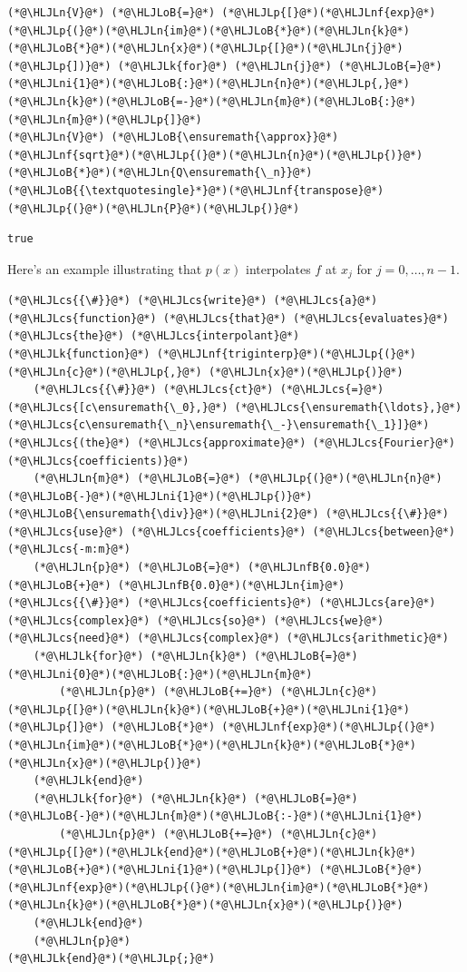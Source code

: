 \documentclass[12pt,landscape]{article}
\newcommand{\HLJLk}[1]{\textcolor[RGB]{148,91,176}{\textbf{#1}}}
\newcommand{\HLJLn}[1]{#1}
\newcommand{\HLJLnf}[1]{\textcolor[RGB]{66,102,213}{#1}}
\newcommand{\HLJLnfB}[1]{\textcolor[RGB]{59,151,46}{#1}}
\newcommand{\HLJLni}[1]{\textcolor[RGB]{59,151,46}{#1}}
\newcommand{\HLJLoB}[1]{\textcolor[RGB]{102,102,102}{\textbf{#1}}}
\newcommand{\HLJLp}[1]{#1}
\newcommand{\HLJLcs}[1]{\textcolor[RGB]{153,153,119}{\textit{#1}}}
\begin{document}
{\begin{lstlisting}
(*@\HLJLn{V}@*) (*@\HLJLoB{=}@*) (*@\HLJLp{[}@*)(*@\HLJLnf{exp}@*)(*@\HLJLp{(}@*)(*@\HLJLn{im}@*)(*@\HLJLoB{*}@*)(*@\HLJLn{k}@*)(*@\HLJLoB{*}@*)(*@\HLJLn{x}@*)(*@\HLJLp{[}@*)(*@\HLJLn{j}@*)(*@\HLJLp{])}@*) (*@\HLJLk{for}@*) (*@\HLJLn{j}@*) (*@\HLJLoB{=}@*) (*@\HLJLni{1}@*)(*@\HLJLoB{:}@*)(*@\HLJLn{n}@*)(*@\HLJLp{,}@*) (*@\HLJLn{k}@*)(*@\HLJLoB{=-}@*)(*@\HLJLn{m}@*)(*@\HLJLoB{:}@*)(*@\HLJLn{m}@*)(*@\HLJLp{]}@*)
(*@\HLJLn{V}@*) (*@\HLJLoB{\ensuremath{\approx}}@*) (*@\HLJLnf{sqrt}@*)(*@\HLJLp{(}@*)(*@\HLJLn{n}@*)(*@\HLJLp{)}@*)(*@\HLJLoB{*}@*)(*@\HLJLn{Q\ensuremath{\_n}}@*)(*@\HLJLoB{{\textquotesingle}*}@*)(*@\HLJLnf{transpose}@*)(*@\HLJLp{(}@*)(*@\HLJLn{P}@*)(*@\HLJLp{)}@*)
\end{lstlisting}

\begin{lstlisting}
true
\end{lstlisting}


Here's an example illustrating that $p(x)$ interpolates $f$ at $x_{j}$ for $j = 0, \ldots, n-1$.


\begin{lstlisting}
(*@\HLJLcs{{\#}}@*) (*@\HLJLcs{write}@*) (*@\HLJLcs{a}@*) (*@\HLJLcs{function}@*) (*@\HLJLcs{that}@*) (*@\HLJLcs{evaluates}@*) (*@\HLJLcs{the}@*) (*@\HLJLcs{interpolant}@*)
(*@\HLJLk{function}@*) (*@\HLJLnf{triginterp}@*)(*@\HLJLp{(}@*)(*@\HLJLn{c}@*)(*@\HLJLp{,}@*) (*@\HLJLn{x}@*)(*@\HLJLp{)}@*)
    (*@\HLJLcs{{\#}}@*) (*@\HLJLcs{ct}@*) (*@\HLJLcs{=}@*) (*@\HLJLcs{[c\ensuremath{\_0},}@*) (*@\HLJLcs{\ensuremath{\ldots},}@*) (*@\HLJLcs{c\ensuremath{\_n}\ensuremath{\_-}\ensuremath{\_1}]}@*) (*@\HLJLcs{(the}@*) (*@\HLJLcs{approximate}@*) (*@\HLJLcs{Fourier}@*) (*@\HLJLcs{coefficients)}@*)
    (*@\HLJLn{m}@*) (*@\HLJLoB{=}@*) (*@\HLJLp{(}@*)(*@\HLJLn{n}@*)(*@\HLJLoB{-}@*)(*@\HLJLni{1}@*)(*@\HLJLp{)}@*)(*@\HLJLoB{\ensuremath{\div}}@*)(*@\HLJLni{2}@*) (*@\HLJLcs{{\#}}@*) (*@\HLJLcs{use}@*) (*@\HLJLcs{coefficients}@*) (*@\HLJLcs{between}@*) (*@\HLJLcs{-m:m}@*)
    (*@\HLJLn{p}@*) (*@\HLJLoB{=}@*) (*@\HLJLnfB{0.0}@*) (*@\HLJLoB{+}@*) (*@\HLJLnfB{0.0}@*)(*@\HLJLn{im}@*) (*@\HLJLcs{{\#}}@*) (*@\HLJLcs{coefficients}@*) (*@\HLJLcs{are}@*) (*@\HLJLcs{complex}@*) (*@\HLJLcs{so}@*) (*@\HLJLcs{we}@*) (*@\HLJLcs{need}@*) (*@\HLJLcs{complex}@*) (*@\HLJLcs{arithmetic}@*)
    (*@\HLJLk{for}@*) (*@\HLJLn{k}@*) (*@\HLJLoB{=}@*) (*@\HLJLni{0}@*)(*@\HLJLoB{:}@*)(*@\HLJLn{m}@*)
        (*@\HLJLn{p}@*) (*@\HLJLoB{+=}@*) (*@\HLJLn{c}@*)(*@\HLJLp{[}@*)(*@\HLJLn{k}@*)(*@\HLJLoB{+}@*)(*@\HLJLni{1}@*)(*@\HLJLp{]}@*) (*@\HLJLoB{*}@*) (*@\HLJLnf{exp}@*)(*@\HLJLp{(}@*)(*@\HLJLn{im}@*)(*@\HLJLoB{*}@*)(*@\HLJLn{k}@*)(*@\HLJLoB{*}@*)(*@\HLJLn{x}@*)(*@\HLJLp{)}@*)
    (*@\HLJLk{end}@*)
    (*@\HLJLk{for}@*) (*@\HLJLn{k}@*) (*@\HLJLoB{=}@*) (*@\HLJLoB{-}@*)(*@\HLJLn{m}@*)(*@\HLJLoB{:-}@*)(*@\HLJLni{1}@*)
        (*@\HLJLn{p}@*) (*@\HLJLoB{+=}@*) (*@\HLJLn{c}@*)(*@\HLJLp{[}@*)(*@\HLJLk{end}@*)(*@\HLJLoB{+}@*)(*@\HLJLn{k}@*)(*@\HLJLoB{+}@*)(*@\HLJLni{1}@*)(*@\HLJLp{]}@*) (*@\HLJLoB{*}@*) (*@\HLJLnf{exp}@*)(*@\HLJLp{(}@*)(*@\HLJLn{im}@*)(*@\HLJLoB{*}@*)(*@\HLJLn{k}@*)(*@\HLJLoB{*}@*)(*@\HLJLn{x}@*)(*@\HLJLp{)}@*)
    (*@\HLJLk{end}@*)
    (*@\HLJLn{p}@*)
(*@\HLJLk{end}@*)(*@\HLJLp{;}@*)
\end{lstlisting}


}
\end{document}
